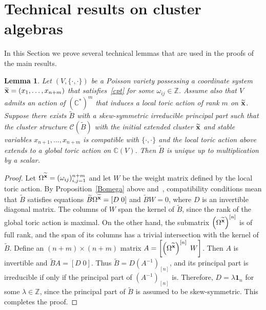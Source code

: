 \documentclass{amsart}
\newtheorem{lemma}[theorem]{Lemma}
\theoremstyle{definition}
\theoremstyle{remark}
\numberwithin{equation}{section}
\numberwithin{theorem}{section}
\begin{document}
\section{Technical results on cluster algebras}

In this  Section we prove several technical lemmas that are used in the proofs of the main results.

\begin{lemma}
\label{Q-restore}
Let $(V, {{\{\cdot,\cdot\}}})$ be a Poisson variety possessing a coordinate system ${{\widetilde{\bf x}}}=(x_1,\dots,x_{n+m})$
that satisfies~\eqref{cpt} for some
$\omega_{ij}\in \mathbb{Z}$. Assume also that $V$ admits an action of  
$\left ( \mathbb{C}^*\right )^m$ that induces a local toric action of rank $m$ on ${{\widetilde{\bf x}}}$. 
Suppose there exists ${{\widetilde{B}}}$ with a skew-symmetric irreducible principal part 
such that the cluster structure
${{\mathcal C}}({{\widetilde{B}}})$ with  the initial extended cluster ${{\widetilde{\bf x}}}$ and stable variables $x_{n+1},\dots,x_{n+m}$  
is compatible with ${{\{\cdot,\cdot\}}}$ and the local toric action above extends to a global toric action on
${{\mathbb C}}(V)$.  Then ${{\widetilde{B}}}$ is unique up to multiplication by a scalar.
\end{lemma}

\begin{proof} Let $\Omega^{{\widetilde{\bf x}}}=(\omega_{ij})_{i,j=1}^{n+m}$ and let $W$ be the weight matrix defined by the local toric action. By Proposition~\ref{Bomega} above and~\cite[Lemma~2.3]{GSV1}, 
compatibility conditions mean that ${{\widetilde{B}}}$ satisfies equations ${{\widetilde{B}}} \Omega^{{\widetilde{\bf x}}} = \left [ D\; 0\right ]$ 
and  ${{\widetilde{B}}} W = 0$, where $D$ is an invertible diagonal matrix. 
The columns of $W$ span the kernel of ${{\widetilde{B}}}$, since the rank of the global toric action is maximal. 
On the other hand,
the submatrix $\left (\Omega^{{\widetilde{\bf x}}}\right )^{[n]}$ is of full rank, and the span of its columns has a
 trivial intersection with the kernel of ${{\widetilde{B}}}$. Define an $(n+m)\times (n+m)$ matrix $A = \left [ \left (\Omega^{{\widetilde{\bf x}}}\right )^{[n]}\; W \right ]$. Then $A$ is invertible and
${{\widetilde{B}}} A =  \left [ D\; 0\right ]$. Thus ${{\widetilde{B}}} = D (A^{-1})_{[n]}$, and its principal part is irreducible 
if only if the principal part of  $(A^{-1})_{[n]}$ is. Therefore, 
$D=\lambda {\mathbf 1}_{n}$ for some $\lambda \in \mathbb{Z}$,
since the principal part of ${{\widetilde{B}}}$ is assumed to be skew-symmetric. This
completes the proof.
\end{proof}
\end{document}
